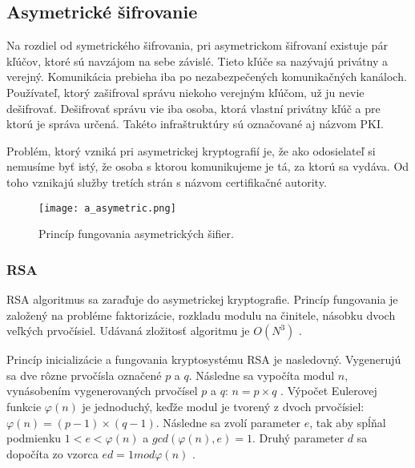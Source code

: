\documentclass[12pt,a4paper,oneside,openright]{report}
\begin{document}

\subsection{Asymetrické šifrovanie}  \label{s_cpyt_asymetric}
Na rozdiel od symetrického šifrovania, pri asymetrickom šifrovaní existuje pár kľúčov, ktoré sú navzájom na sebe závislé. Tieto kľúče sa nazývajú privátny a verejný. Komunikácia prebieha iba po nezabezpečených komunikačných kanáloch. Používateľ, ktorý zašifroval správu niekoho verejným kľúčom, už ju nevie dešifrovať. Dešifrovať správu vie iba osoba, ktorá vlastní privátny kľúč a pre ktorú je správa určená.  Takéto infraštruktúry sú označované aj názvom PKI.

Problém, ktorý vzniká pri asymetrickej kryptografií je, že ako odosielateľ si nemusíme byť istý, že osoba s ktorou komunikujeme je tá, za ktorú sa vydáva. Od toho vznikajú služby tretích strán s názvom certifikačné autority.

\begin{figure*}[!htb]
	\centering
	\texttt{[image: a\_asymetric.png]}
	\caption{Princíp fungovania asymetrických šifier. \cite{cryptographyhandbook}}
	\label{f:o_asymetric}
\end{figure*}

\subsubsection{RSA}
RSA algoritmus sa zaraďuje do asymetrickej kryptografie. Princíp fungovania je založený na probléme faktorizácie, rozkladu modulu na činitele, násobku dvoch veľkých prvočísiel. Udávaná zložitosť algoritmu je $O(N^3)$ \cite{rsalesson}.

Princíp inicializácie a fungovania kryptosystému RSA je nasledovný. Vygenerujú sa dve rôzne prvočísla označené $p$ a $q$. Následne sa vypočíta modul $n$, vynásobením vygenerovaných prvočísel $p$ a $q$: $n= p \times q $ \cite{rsalesson}.
Výpočet Eulerovej funkcie $\varphi(n)$ je jednoduchý, keďže modul je tvorený z dvoch prvočísiel: $\varphi(n)=(p-1)\times(q-1)$. Následne sa zvolí parameter $e$, tak aby spĺňal podmienku $1<e<\varphi(n)$ a $gcd(\varphi(n),e)=1$. Druhý parameter $d$ sa dopočíta zo vzorca $ed=1 mod \varphi(n)$ \cite{rsalesson}.
\end{document}
